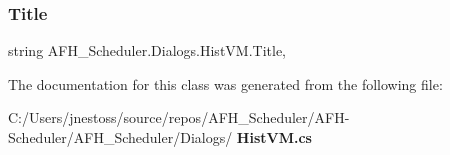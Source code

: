 \mbox{\label{class_a_f_h___scheduler_1_1_dialogs_1_1_hist_v_m_a7078679ab85ec65c5cef7e503369fa8b}} 
\subsubsection{Title}
{\footnotesize\ttfamily string A\+F\+H\+\_\+\+Scheduler.\+Dialogs.\+Hist\+V\+M.\+Title\hspace{0.3cm}{\ttfamily [get]}, {\ttfamily [set]}}



The documentation for this class was generated from the following file\+:\begin{DoxyCompactItemize}
\item 
C\+:/\+Users/jnestoss/source/repos/\+A\+F\+H\+\_\+\+Scheduler/\+A\+F\+H-\/\+Scheduler/\+A\+F\+H\+\_\+\+Scheduler/\+Dialogs/\textbf{ Hist\+V\+M.\+cs}\end{DoxyCompactItemize}
